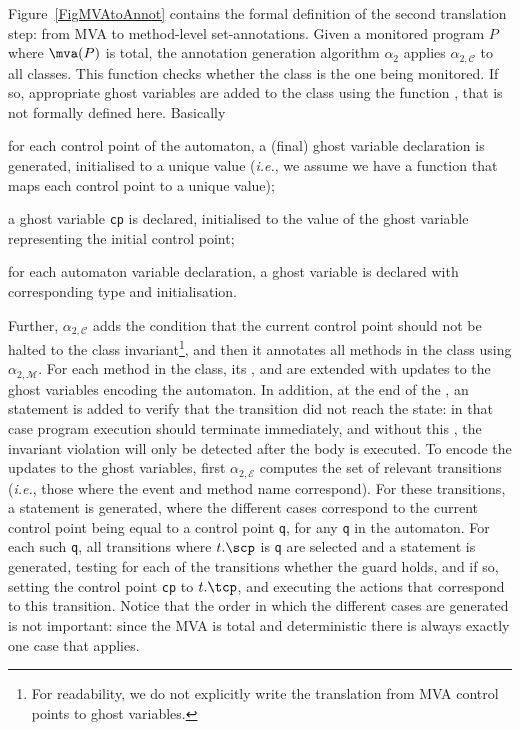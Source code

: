 Figure~\ref{FigMVAtoAnnot} contains the formal definition of the
second translation step: from MVA to method-level set-annotations.
Given a monitored program \(P\) where \(\mva(P)\) is total,
the annotation generation algorithm \(\alpha_2\) applies
\(\alpha_{2, \mathcal{C}}\) to all classes.
This function checks whether the class is the one being
monitored. If so, appropriate ghost variables are added to the class
using the function \newgvs, that is not formally defined here. Basically
\begin{inparaenum}
\item for each control point of the automaton, a (final) ghost
variable declaration is generated, initialised to a unique value
(\emph{i.e.}, we assume we have a function \unique that maps each
control point to a unique value);
\item a ghost variable \texttt{cp} is declared, initialised to the
value of the ghost variable representing the initial control point;
\item for each automaton variable declaration, a ghost variable is
declared with corresponding type and initialisation.
\end{inparaenum}
Further, \(\alpha_{2, \mathcal{C}}\) adds the condition that the
current control point should not be halted to the class
invariant\footnote{For readability, we do not explicitly write the
translation from MVA control points to ghost variables.}, and then it
annotates all methods in the class using \(\alpha_{2,
\mathcal{M}}\). For each method in the class, its \preset, \postset
and \excset are extended with updates to the ghost variables encoding
the automaton. In addition, at the end of the \preset, an \Assert
statement is added to verify that the transition did not reach the
\halted state: in that case program execution should terminate
immediately, and without this \Assert, the invariant violation will
only be detected after the body is executed. To encode the updates to
the ghost variables, first \(\alpha_{2, \mathcal{E}}\) computes the
set of relevant transitions (\emph{i.e.}, those where the event and
method name correspond). For these transitions, a \CaseJML
statement is generated, where the different cases correspond to the current
control point being equal to a control point \texttt{q}, for any
\texttt{q} in the automaton. For each such \texttt{q}, all transitions
where \(t.\scp\) is \texttt{q} are selected and a \CaseJML
statement is generated, testing for each of the transitions whether
the guard holds, and if so, setting the control point \texttt{cp} to
\(t.\tcp\), and executing the actions that correspond to this
transition.
Notice that the order in which the different cases are generated is
not important: since the MVA is total and deterministic there is
always exactly one case that applies.

